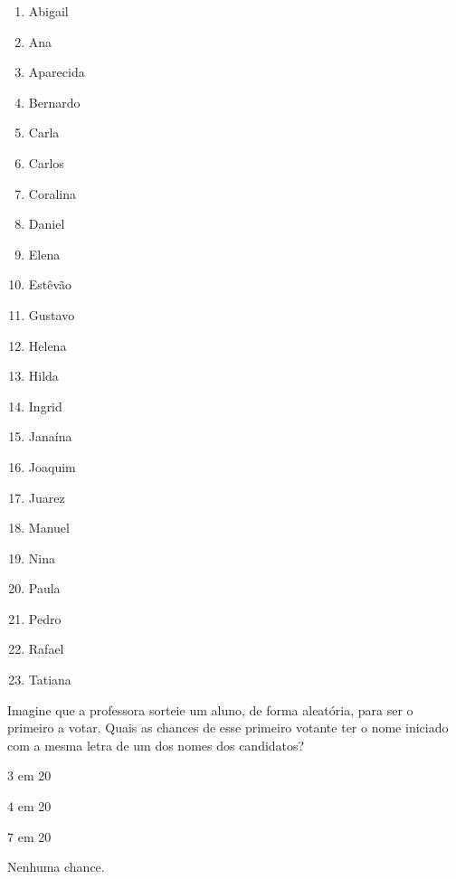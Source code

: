 \begin{enumerate}
\item Abigail

\item Ana

\item Aparecida

\item Bernardo

\item Carla

\item Carlos

\item Coralina

\item Daniel 

\item Elena

\item Estêvão

\item Gustavo

\item Helena

\item Hilda

\item Ingrid

\item Janaína

\item Joaquim

\item Juarez

\item Manuel

\item Nina

\item Paula

\item Pedro

\item Rafael

\item Tatiana
\end{enumerate}

Imagine que a professora sorteie um aluno, de forma aleatória, para ser o primeiro a votar. Quais as chances de esse primeiro votante ter o nome iniciado com a mesma letra de um dos nomes dos candidatos?

\begin{escolha}
\item
3 em 20
\item
4 em 20
\item
7 em 20
\item
Nenhuma chance.
\end{escolha}

